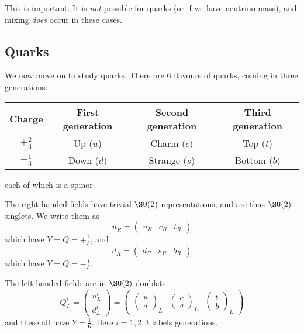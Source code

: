 \documentclass[a4paper]{article}
\begin{document}
This is important. It is \emph{not} possible for quarks (or if we have neutrino mass), and mixing \emph{does} occur in these cases.

\subsection{Quarks}
We now move on to study quarks. There are 6 flavours of quarks, coming in three generations:
\begin{center}
  \begin{tabular}{cccc}
    \toprule
    Charge & First generation & Second generation & Third generation\\
    \midrule
    $+\frac{2}{3}$ & Up ($u$) & Charm ($c$) & Top ($t$)\\
    $-\frac{1}{3}$ & Down ($d$) & Strange ($s$) & Bottom ($b$)\\
    \bottomrule
  \end{tabular}
\end{center}
each of which is a spinor.

The right handed fields have trivial $\SU(2)$ representations, and are thus $\SU(2)$ singlets. We write them as
\[
  u_R = \begin{pmatrix} u_R & c_R & t_R\end{pmatrix}
\]
which have $Y = Q = +\frac{2}{3}$, and
\[
  d_R = \begin{pmatrix} d_R & s_R & b_R\end{pmatrix}
\]
which have $Y = Q = -\frac{1}{3}$.

The left-handed fields are in $\SU(2)$ doublets
\[
  Q_L^i =
  \begin{pmatrix}
    u_L^i\\
    d_L^i
  \end{pmatrix} =
  \begin{pmatrix}
    \begin{pmatrix}
      u\\d
    \end{pmatrix}_L &
    \begin{pmatrix}
      c\\
      s
    \end{pmatrix}_L &
    \begin{pmatrix}
      t\\
      b
    \end{pmatrix}_L
  \end{pmatrix}
\]
and these all have $Y = \frac{1}{6}$. Here $i = 1, 2, 3$ labels generations.
\end{document}
